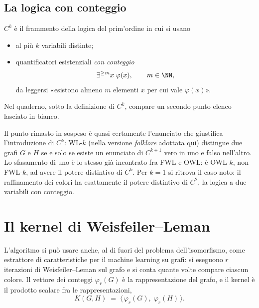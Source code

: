 \subsection{La logica con conteggio}

\begin{definizione}[Il frammento $C^{k}$]
  $C^{k}$ è il frammento della logica del prim'ordine in cui si usano
  \begin{itemize}
    \item al più $k$ variabili distinte;
    \item quantificatori esistenziali \emph{con conteggio}
      \[
        \exists^{\ge m} x \; \varphi(x), \qquad m \in \NN,
      \]
      da leggersi «esistono almeno $m$ elementi $x$ per cui vale $\varphi(x)$».
  \end{itemize}
\end{definizione}

\begin{lacuna}
  Nel quaderno, sotto la definizione di $C^{k}$, compare un secondo punto elenco lasciato
  in bianco.
\end{lacuna}

\begin{osservazione}
  Il punto rimasto in sospeso è quasi certamente l'enunciato che giustifica
  l'introduzione di $C^{k}$: WL-$k$ (nella versione \emph{folklore} adottata qui)
  distingue due grafi $G$ e $H$ se e solo se esiste un enunciato di $C^{k+1}$ vero in uno
  e falso nell'altro. Lo sfasamento di uno è lo stesso già incontrato fra FWL e OWL: è
  OWL-$k$, non FWL-$k$, ad avere il potere distintivo di $C^{k}$. Per $k = 1$ si ritrova
  il caso noto: il raffinamento dei colori ha esattamente il potere distintivo di $C^{2}$,
  la logica a due variabili con conteggio.
\end{osservazione}

\section{Il kernel di Weisfeiler--Leman}

L'algoritmo si può usare anche, al di fuori del problema dell'isomorfismo, come
estrattore di caratteristiche per il machine learning su grafi: si eseguono $r$
iterazioni di Weisfeiler--Leman sul grafo e si conta quante volte compare ciascun colore.
Il vettore dei conteggi $\varphi_r(G)$ è la rappresentazione del grafo, e il kernel è il
prodotto scalare fra le rappresentazioni,
\[
  K(G,H) \;=\; \langle\, \varphi_r(G),\; \varphi_r(H) \,\rangle .
\]

